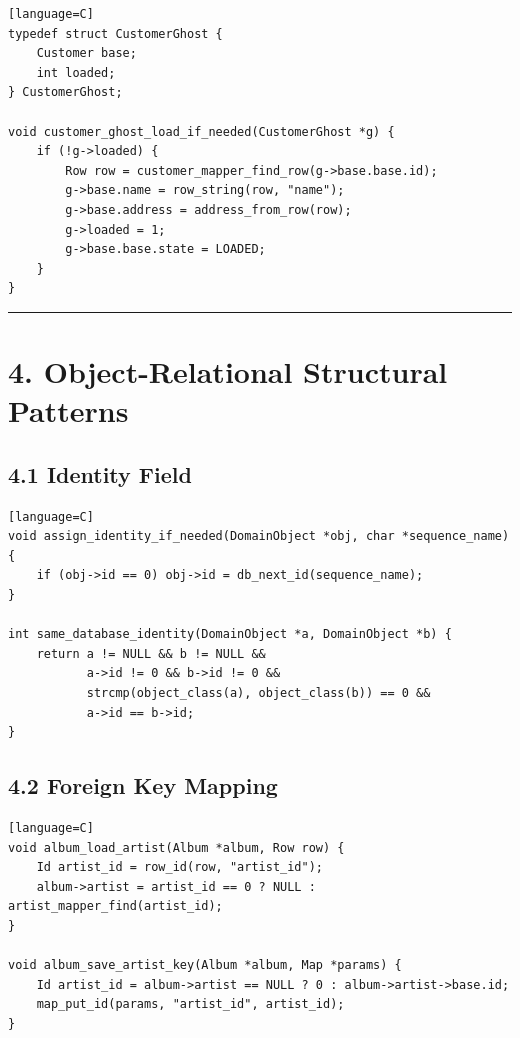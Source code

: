 \documentclass[11pt]{article}
\begin{document}
\begin{verbatim}[language=C]
typedef struct CustomerGhost {
    Customer base;
    int loaded;
} CustomerGhost;

void customer_ghost_load_if_needed(CustomerGhost *g) {
    if (!g->loaded) {
        Row row = customer_mapper_find_row(g->base.base.id);
        g->base.name = row_string(row, "name");
        g->base.address = address_from_row(row);
        g->loaded = 1;
        g->base.base.state = LOADED;
    }
}
\end{verbatim}

\begin{center}\rule{0.5\linewidth}{0.5pt}\end{center}

\section{4. Object-Relational Structural
Patterns}\label{object-relational-structural-patterns}

\subsection{4.1 Identity Field}\label{identity-field}

\begin{verbatim}[language=C]
void assign_identity_if_needed(DomainObject *obj, char *sequence_name) {
    if (obj->id == 0) obj->id = db_next_id(sequence_name);
}

int same_database_identity(DomainObject *a, DomainObject *b) {
    return a != NULL && b != NULL &&
           a->id != 0 && b->id != 0 &&
           strcmp(object_class(a), object_class(b)) == 0 &&
           a->id == b->id;
}
\end{verbatim}

\subsection{4.2 Foreign Key Mapping}\label{foreign-key-mapping}

\begin{verbatim}[language=C]
void album_load_artist(Album *album, Row row) {
    Id artist_id = row_id(row, "artist_id");
    album->artist = artist_id == 0 ? NULL : artist_mapper_find(artist_id);
}

void album_save_artist_key(Album *album, Map *params) {
    Id artist_id = album->artist == NULL ? 0 : album->artist->base.id;
    map_put_id(params, "artist_id", artist_id);
}
\end{verbatim}
\end{document}
